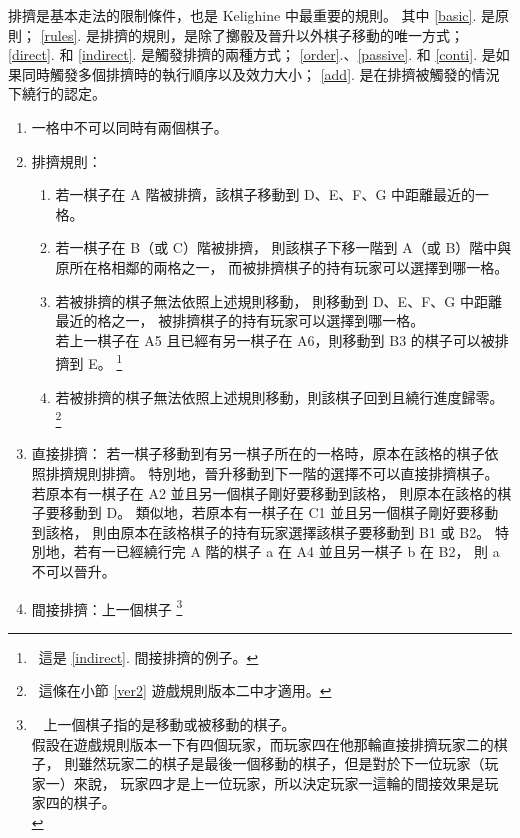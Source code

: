 \documentclass[11pt,a4paper]{article}
\begin{document}
排擠是基本走法的限制條件，也是 Kelighine 中最重要的規則。
其中 \ref{basic}.\! 是原則；
\ref{rules}.\! 是排擠的規則，是除了擲骰及晉升以外棋子移動的唯一方式；
\ref{direct}.\! 和 \ref{indirect}.\! 是觸發排擠的兩種方式；
\ref{order}.、\ref{passive}.\! 和 \ref{conti}.\! 是如果同時觸發多個排擠時的執行順序以及效力大小；
\ref{add}.\! 是在排擠被觸發的情況下繞行的認定。

\begin{enumerate}
	\item \label{basic}
		一格中不可以同時有兩個棋子。
	\item \label{rules}
		\textsf{排擠規則}：
		\begin{enumerate}
			\item 若一棋子在 A 階被排擠，該棋子移動到 D、E、F、G 中距離最近的一格。
			\item 
				若一棋子在 B（或 C）階被排擠，
				則該棋子下移一階到 A（或 B）階中與原所在格相鄰的兩格之一，
				而被排擠棋子的持有玩家可以選擇到哪一格。
			\item
				若被排擠的棋子無法依照上述規則移動，
				則移動到 D、E、F、G 中距離最近的格之一，
				被排擠棋子的持有玩家可以選擇到哪一格。\\
				\zB 若上一棋子在 A5 且已經有另一棋子在 A6，則移動到 B3 的棋子可以被排擠到 E。
					\footnote{\ 這是 \ref{indirect}.\! 間接排擠的例子。}
			\item
				若被排擠的棋子無法依照上述規則移動，則該棋子回到且繞行進度歸零。
					\footnote{\ 這條在小節 \ref{ver2} 遊戲規則版本二中才適用。}
		\end{enumerate}
	\item \label{direct}
		\textsf{直接排擠}：
		若一棋子移動到有另一棋子所在的一格時，原本在該格的棋子依照排擠規則排擠。
		特別地，晉升移動到下一階的選擇不可以直接排擠棋子。\\
		\zB 若原本有一棋子在 A2 並且另一個棋子剛好要移動到該格，
		則原本在該格的棋子要移動到 D。
		類似地，若原本有一棋子在 C1 並且另一個棋子剛好要移動到該格，
		則由原本在該格棋子的持有玩家選擇該棋子要移動到 B1 或 B2。
		特別地，若有一已經繞行完 A 階的棋子 a 在 A4 並且另一棋子 b 在 B2，
		則 a 不可以晉升。
	\item \label{indirect}
		\textsf{間接排擠}：上一個棋子
			\footnote{\ \label{last}
			上一個棋子指的是移動或被移動的棋子。\\
			\zB 假設在遊戲規則版本一下有四個玩家，而玩家四在他那輪直接排擠玩家二的棋子，
			則雖然玩家二的棋子是最後一個移動的棋子，但是對於下一位玩家（玩家一）來說，
			玩家四才是上一位玩家，所以決定玩家一這輪的間接效果是玩家四的棋子。\\
}
\end{enumerate}
\end{document}
